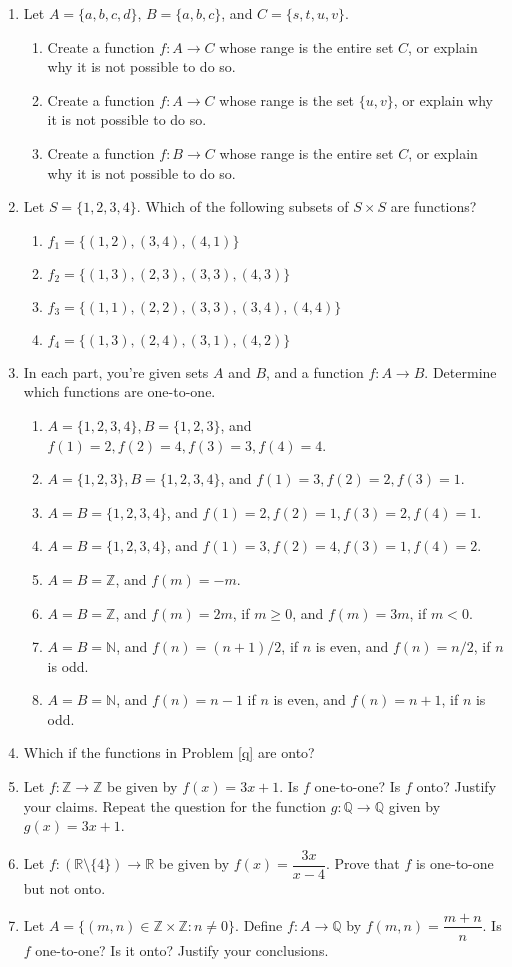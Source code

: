 \documentclass[letterpaper,12pt]{article}
\newcommand{\N}{\mathbb{N}}
\newcommand{\Z}{\mathbb{Z}}
\newcommand{\R}{\mathbb{R}}
\newcommand{\Q}{\mathbb{Q}}
\begin{document}
\begin{enumerate}
\item Let $A=\{a,b,c,d\}$, $B=\{a,b,c\}$, and $C=\{s,t,u,v\}$.
\begin{enumerate}
 \item Create a function $f:A\to C$ whose range is the entire set $C$, or explain why it is not possible to do so.
 \item Create a function $f:A\to C$ whose range is the set $\{u,v\}$, or explain why it is not possible to do so. 
 \item Create a function $f:B\to C$ whose range is the entire set $C$, or explain why it is not possible to do so.
\end{enumerate}
\item Let $S=\{1,2,3,4\}$. Which of the following subsets of $S\times S$ are functions?
\begin{enumerate}
 \item $f_1 = \{(1,2), (3,4), (4,1)\}$
 \item $f_2 = \{(1,3), (2,3), (3,3), (4,3)\}$
 \item $f_3 = \{(1,1), (2,2), (3,3), (3,4), (4,4)\}$
 \item $f_4 = \{(1,3), (2,4), (3,1), (4,2)\}$
\end{enumerate}
\item In each part, you're given sets $A$ and $B$, and a function $f:A\to B$. Determine which functions are one-to-one.\label{q}
\begin{enumerate}
 \item $A=\{1,2,3,4\}, B=\{1,2,3\}$, and $f(1)=2, f(2)=4, f(3)=3, f(4)=4$.
 \item $A=\{1,2,3\}, B=\{1,2,3,4\}$, and $f(1)=3, f(2)=2, f(3)=1$.
 \item $A=B=\{1,2,3,4\}$, and $f(1)=2, f(2)=1, f(3)=2, f(4)=1$.
 \item $A=B=\{1,2,3,4\}$, and $f(1)=3, f(2)=4, f(3)=1, f(4)=2$.
 \item $A=B=\Z$, and $f(m)=-m$.
 \item $A=B=\Z$, and $f(m)=2m$, if $m\geq 0$, and $f(m)=3m$, if $m<0$.
 \item $A=B=\N$, and $f(n)=(n+1)/2$, if $n$ is even, and $f(n)=n/2$, if $n$ is odd.
 \item $A=B=\N$, and $f(n)=n-1$ if $n$ is even, and $f(n)=n+1$, if $n$ is odd.
\end{enumerate}
\item Which if the functions in Problem \ref{q} are onto?
\item Let $f:\Z\to\Z$ be given by $f(x)=3x+1$. Is $f$ one-to-one? Is $f$ onto? Justify your claims. Repeat the question for the function $g:\Q\to\Q$ given by $g(x)=3x+1$.
\item Let $f:(\R\setminus\{4\})\to\R$ be given by $f(x)=\dfrac{3x}{x-4}$. Prove that $f$ is one-to-one but not onto.
\item Let $A = \{(m,n)\in\Z\times\Z : n\neq 0\}$. Define $f:A\to\Q$ by $f(m,n) = \dfrac{m+n}{n}$. Is $f$ one-to-one? Is it onto? Justify your conclusions.
\end{enumerate}
\end{document}
